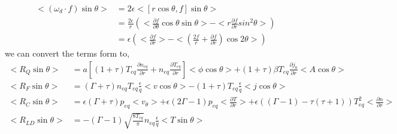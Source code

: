 \documentclass[11pt,a4paper]{article}
\begin{document}
	\begin{equation}
	\begin{aligned}
		<(\omega_d\cdot{f})\sin\theta>
		&=2\epsilon<[r\cos\theta,f]\sin\theta>	\\
		&=\frac{2\epsilon}{r}(<\frac{\partial{f}}{\partial\theta}\cos\theta\sin\theta>-<r\frac{\partial{f}}{\partial{r}}sin^2\theta>) \\
		&=\epsilon(<\frac{\partial{f}}{\partial{r}}>
		-<(\frac{2f}{r}+\frac{\partial{f}}{\partial{r}})\cos{2\theta}>)
	\end{aligned}
	\end{equation}
	we can convert the terms form to,
	\begin{equation}
	\begin{aligned}
		<R_Q\sin\theta>&=
		a[(1+\tau)T_{eq}\frac{\partial{n_{eq}}}{\partial{r}}+n_{eq}\frac{\partial{T_{eq}}}{\partial{r}}]<\phi\cos\theta>
		+(1+\tau)\beta{T_{eq}}\frac{\partial{j_0}}{\partial{r}}<A\cos\theta>\\
		<R_F\sin\theta>&=
		(\Gamma+\tau)n_{eq}T_{eq}\frac{\epsilon}{q}<v\cos\theta>
		-(1+\tau)T_{eq}\frac{\epsilon}{q}<j\cos\theta>	\\
		<R_C\sin\theta>&=
		\epsilon(\Gamma+\tau)p_{eq}<v_\theta>
		+\epsilon(2\Gamma-1)p_{eq}<\frac{\partial{T}}{\partial{r}}>
		+\epsilon((\Gamma-1)-\tau(\tau+1))T_{eq}^2<\frac{\partial{n}}{\partial{r}}>	\\
		<R_{LD}\sin\theta>&=
		-(\Gamma-1)\sqrt{\frac{8T_{eq}}{\pi}}n_{eq}\frac{\epsilon}{q}<T\sin\theta>	\\
	\end{aligned}
	\end{equation}
	
\end{document}
